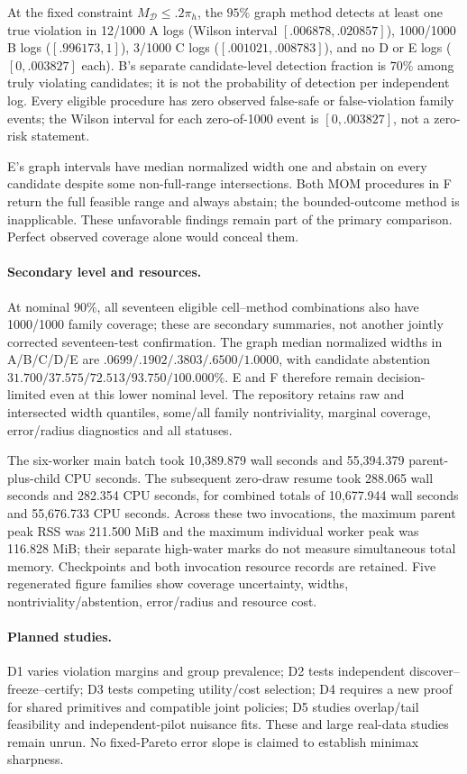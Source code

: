 At the fixed constraint $M_{\mathcal D}\le .2\pi_h$, the $95\%$ graph method detects at least one true violation in 12/1000 A logs (Wilson interval $[.006878,.020857]$), 1000/1000 B logs ($[.996173,1]$), 3/1000 C logs ($[.001021,.008783]$), and no D or E logs ($[0,.003827]$ each). B's separate candidate-level detection fraction is $70\%$ among truly violating candidates; it is not the probability of detection per independent log. Every eligible procedure has zero observed false-safe or false-violation family events; the Wilson interval for each zero-of-1000 event is $[0,.003827]$, not a zero-risk statement.

E's graph intervals have median normalized width one and abstain on every candidate despite some non-full-range intersections. Both MOM procedures in F return the full feasible range and always abstain; the bounded-outcome method is inapplicable. These unfavorable findings remain part of the primary comparison. Perfect observed coverage alone would conceal them.

\paragraph{Secondary level and resources.}
At nominal $90\%$, all seventeen eligible cell--method combinations also have 1000/1000 family coverage; these are secondary summaries, not another jointly corrected seventeen-test confirmation. The graph median normalized widths in A/B/C/D/E are $.0699/.1902/.3803/.6500/1.0000$, with candidate abstention $31.700/37.575/72.513/93.750/100.000\%$. E and F therefore remain decision-limited even at this lower nominal level. The repository retains raw and intersected width quantiles, some/all family nontriviality, marginal coverage, error/radius diagnostics and all statuses.

The six-worker main batch took 10,389.879 wall seconds and 55,394.379 parent-plus-child CPU seconds. The subsequent zero-draw resume took 288.065 wall seconds and 282.354 CPU seconds, for combined totals of 10,677.944 wall seconds and 55,676.733 CPU seconds. Across these two invocations, the maximum parent peak RSS was 211.500 MiB and the maximum individual worker peak was 116.828 MiB; their separate high-water marks do not measure simultaneous total memory. Checkpoints and both invocation resource records are retained. Five regenerated figure families show coverage uncertainty, widths, nontriviality/abstention, error/radius and resource cost.

\paragraph{Planned studies.}
D1 varies violation margins and group prevalence; D2 tests independent discover--freeze--certify; D3 tests competing utility/cost selection; D4 requires a new proof for shared primitives and compatible joint policies; D5 studies overlap/tail feasibility and independent-pilot nuisance fits. These and large real-data studies remain unrun. No fixed-Pareto error slope is claimed to establish minimax sharpness.
